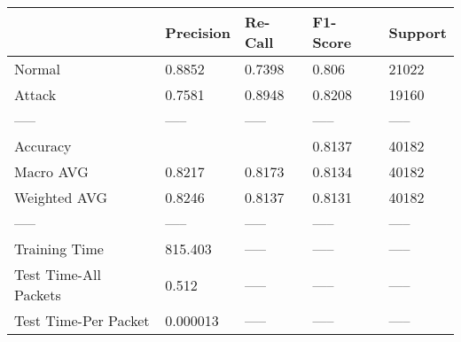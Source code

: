 \begin{tabular}{lllll}
\toprule
{} & Precision & Re-Call & F1-Score & Support \\
\midrule
Normal                &    0.8852 &  0.7398 &    0.806 &   21022 \\
Attack                &    0.7581 &  0.8948 &   0.8208 &   19160 \\
-----                 &     ----- &   ----- &    ----- &   ----- \\
Accuracy              &           &         &   0.8137 &   40182 \\
Macro AVG             &    0.8217 &  0.8173 &   0.8134 &   40182 \\
Weighted AVG          &    0.8246 &  0.8137 &   0.8131 &   40182 \\
-----                 &     ----- &   ----- &    ----- &   ----- \\
Training Time         &   815.403 &   ----- &    ----- &   ----- \\
Test Time-All Packets &     0.512 &   ----- &    ----- &   ----- \\
Test Time-Per Packet  &  0.000013 &   ----- &    ----- &   ----- \\
\bottomrule
\end{tabular}
